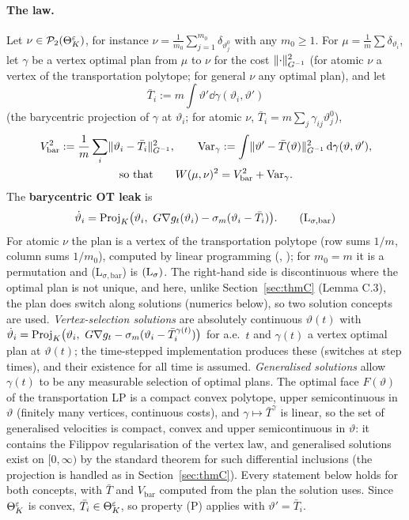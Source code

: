 \paragraph{The law.} Let $\nu\in\mathcal{P}_2(\Theta_K^{\varepsilon})$, for instance $\nu = \frac1{m_0}\sum_{j=1}^{m_0}\delta_{\vartheta^0_j}$
with any $m_0\ge1$. For $\mu = \frac1m\sum\delta_{\vartheta_i}$, let $\gamma$ be a vertex optimal plan from $\mu$ to
$\nu$ for the cost $\lVert \cdot\rVert^2_{G^{-1}}$ (for atomic $\nu$ a vertex of the transportation polytope; for general
$\nu$ any optimal plan), and let
\[
  \bar T_i := m\int\vartheta'\dd\gamma(\vartheta_i,\vartheta')
\]
(the barycentric projection of $\gamma$ at $\vartheta_i$; for atomic $\nu$,
$\bar T_i = m\sum_j\gamma_{ij}\vartheta^0_j$),
\begin{gather*}
  V_{\mathrm{bar}}^2 := \frac1m\sum_i\lVert \vartheta_i - \bar T_i\rVert^2_{G^{-1}},\qquad
  \mathrm{Var}_\gamma := \int\lVert \vartheta' - \bar T(\vartheta)\rVert^2_{G^{-1}}\,\mathrm{d}\gamma(\vartheta,\vartheta'),\\
  \text{so that}\qquad W(\mu,\nu)^2 = V_{\mathrm{bar}}^2 + \mathrm{Var}_\gamma.
\end{gather*}
The \textbf{barycentric OT leak} is
\begin{equation}\label{eq:thmCprime:Lsigbar}
  \dot\vartheta_i = \Proj\bigl(\vartheta_i,\ G\nabla g_t(\vartheta_i) - \sigma_m(\vartheta_i - \bar T_i)\bigr).
  \tag{$\mathrm{L}_{\sigma,\mathrm{bar}}$}
\end{equation}
For atomic $\nu$ the plan is a vertex of the transportation polytope (row sums $1/m$, column sums $1/m_0$), computed
by linear programming (, ); for $m_0 = m$ it is a
permutation and \textup{(L$_{\sigma,\mathrm{bar}}$)} is $(\mathrm{L}_\sigma)$. The right-hand side is discontinuous where the
optimal plan is not unique, and here, unlike Section~\ref{sec:thmC} (Lemma C.3), the plan does switch along solutions
(numerics below), so two solution concepts are used. \emph{Vertex-selection solutions} are absolutely continuous
$\vartheta(t)$ with
$\dot\vartheta_i = \operatorname{Proj}_K\bigl(\vartheta_i,\ G\nabla g_t - \sigma_m(\vartheta_i - \bar T_i^{\gamma(t)})\bigr)$ for a.e.\
$t$ and $\gamma(t)$ a vertex optimal plan at $\vartheta(t)$; the time-stepped implementation produces these (switches
at step times), and their existence for all time is assumed. \emph{Generalised solutions} allow $\gamma(t)$ to be any
measurable selection of optimal plans. The optimal face $F(\vartheta)$ of the transportation LP is a compact convex
polytope, upper semicontinuous in $\vartheta$ (finitely many vertices, continuous costs), and
$\gamma\mapsto\bar T^\gamma$ is linear, so the set of generalised velocities is compact, convex and upper
semicontinuous in $\vartheta$: it contains the Filippov regularisation of the vertex law, and generalised solutions
exist on $[0,\infty)$ by the standard theorem for such differential inclusions (the projection is handled as in
Section~\ref{sec:thmC}). Every statement below holds for both concepts, with $\bar T$ and $V_{\mathrm{bar}}$ computed
from the plan the solution uses. Since $\Theta_K^{\varepsilon}$ is convex, $\bar T_i\in\Theta_K^{\varepsilon}$, so property (P) applies with
$\vartheta' = \bar T_i$.

